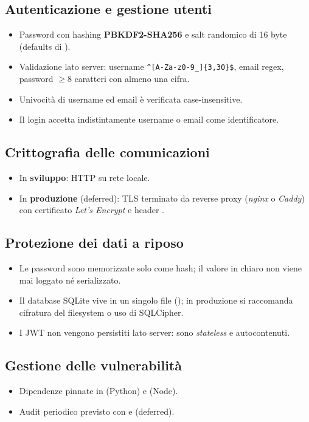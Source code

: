 \subsection{Autenticazione e gestione utenti}
\begin{itemize}
    \item Password con hashing \textbf{PBKDF2-SHA256} e salt randomico di
    16 byte (defaults di ).
    \item Validazione lato server: username
    \verb|^[A-Za-z0-9_]{3,30}$|, email regex, password $\geq 8$ caratteri
    con almeno una cifra.
    \item Univocità di username ed email è verificata case-insensitive.
    \item Il login accetta indistintamente username o email come
    identificatore.
\end{itemize}

\subsection{Crittografia delle comunicazioni}
\begin{itemize}
    \item In \textbf{sviluppo}: HTTP su rete locale.
    \item In \textbf{produzione} (deferred): TLS terminato da reverse proxy
    (\emph{nginx} o \emph{Caddy}) con certificato \emph{Let's Encrypt} e
    header .
\end{itemize}

\subsection{Protezione dei dati a riposo}
\begin{itemize}
    \item Le password sono memorizzate solo come hash; il valore in chiaro
    non viene mai loggato né serializzato.
    \item Il database SQLite vive in un singolo file (); in
    produzione si raccomanda cifratura del filesystem o uso di SQLCipher.
    \item I JWT non vengono persistiti lato server: sono \emph{stateless} e
    autocontenuti.
\end{itemize}

\subsection{Gestione delle vulnerabilità}
\begin{itemize}
    \item Dipendenze pinnate in  (Python) e
     (Node).
    \item Audit periodico previsto con  e 
    (deferred).
\end{itemize}

